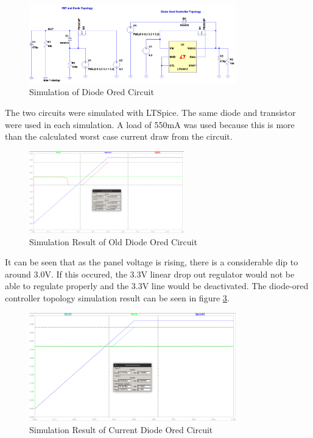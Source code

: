 \documentclass{article}
\numberwithin{figure}{section}
\numberwithin{equation}{section}
\begin{document}
{\begin{figure}[H]
	\centering
	\includegraphics[width=0.8\textwidth]{DiodeORSIM}
	\caption{Simulation of Diode Ored Circuit}
	\label{fig:doredsim}
\end{figure}


The two circuits were simulated with LTSpice. The same diode and transistor were used in each simulation. A load of 550mA was used because this is more than the calculated worst case current draw from the circuit.

\begin{figure}[H]
	\centering
	\includegraphics[width=0.6\textwidth]{DiodeORres1}
	\caption{Simulation Result of Old Diode Ored Circuit}
	\label{fig:doredsimres1}
\end{figure}

It can be seen that as the panel voltage is rising, there is a considerable dip to around 3.0V. If this occured, the 3.3V linear drop out regulator would not be able to regulate properly and the 3.3V line would be deactivated. The diode-ored controller topology simulation result can be seen in figure \ref{fig:doredsimres2}.
\begin{figure}[H]
	\centering
	\includegraphics[width=0.8\textwidth]{DiodeORres2}
	\caption{Simulation Result of Current Diode Ored Circuit}
	\label{fig:doredsimres2}
\end{figure}

}
\end{document}
